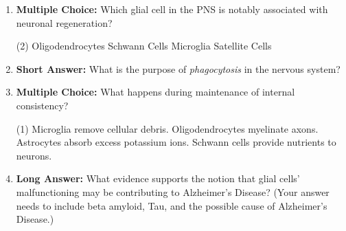 \begin{enumerate}[label=\textbf{Q2.1.\arabic*}]
      \item \textbf{Multiple Choice:} Which glial cell in the PNS is notably associated with neuronal regeneration?
            \begin{tasks}[label=(\Alph*), label-width=1.5em, item-indent=1.7em](2)
                  \task Oligodendrocytes
                  \task Schwann Cells
                  \task Microglia
                  \task Satellite Cells
            \end{tasks}

      \item \textbf{Short Answer:} What is the purpose of \textit{phagocytosis} in the nervous system? \\

      \item \textbf{Multiple Choice:} What happens during maintenance of internal consistency?
            \begin{tasks}[label=(\Alph*), label-width=1.5em, item-indent=1.7em](1)
                  \task Microglia remove cellular debris.
                  \task Oligodendrocytes myelinate axons.
                  \task Astrocytes absorb excess potassium ions.
                  \task Schwann cells provide nutrients to neurons.
            \end{tasks}
      \item \textbf{Long Answer:} What evidence supports the notion that glial cells' malfunctioning may be contributing to Alzheimer's Disease? (Your answer needs to include beta amyloid, Tau, and the possible cause of Alzheimer's Disease.) \\

\end{enumerate}
\newpage
\squigglyline

